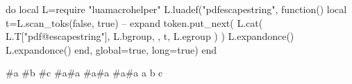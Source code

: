 \documentclass{article}
\begin{document}
\begin{luacode*}
do
	local L=require "luamacrohelper"
	L.luadef("pdfescapestring", function()
		local t=L.scan_toks(false, true)  -- expand
		token.put_next(
			L.cat(
			{
				L.T["pdf@escapestring"],
				L.bgroup,
			}, t,
				{L.egroup}
				)
				)
		L.expandonce()
		L.expandonce()
	end, {global=true, long=true})
end
\end{luacode*}



\ExplSyntaxOn
\begin{imperativerun}

	\zfunction #a #b #c{
		\assigno #a{#a}
		\assigno #a{#a}
		\assigno #a{#a}
	} a b c

\end{imperativerun}
\end{document}
